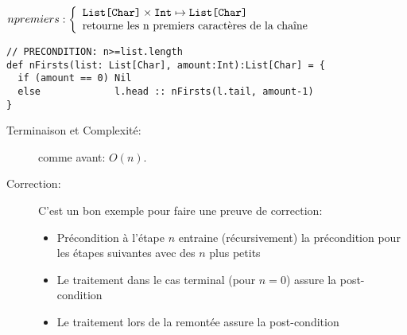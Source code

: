 \documentclass[10pt]{article}\usepackage[nu]{esial}
\begin{document}
\begin{Question}
  $npremiers: \left\{
    \begin{array}{l}
      \text{\texttt{List[Char]}}\times\text{\texttt{Int}}\mapsto \text{\texttt{List[Char]}}\\
      \text{retourne les n premiers caractères de la chaîne}
    \end{array}\right.$  
\end{Question}
\begin{Reponse}
  \begin{Verbatim}
// PRECONDITION: n>=list.length
def nFirsts(list: List[Char], amount:Int):List[Char] = {
  if (amount == 0) Nil
  else             l.head :: nFirsts(l.tail, amount-1)
}
  \end{Verbatim}
  \begin{description}
  \item[Terminaison et Complexité:] comme avant: $O(n)$.
  \item[Correction:] C'est un bon exemple pour faire une preuve de correction:
    \begin{itemize}
    \item Précondition à l'étape $n$ entraine (récursivement) la précondition
      pour les étapes suivantes avec des $n$ plus petits
    \item Le traitement dans le cas terminal (pour $n=0$) assure la
      post-condition
    \item Le traitement lors de la remontée assure la post-condition
    \end{itemize}
  \end{description}
\end{Reponse}
\end{document}

